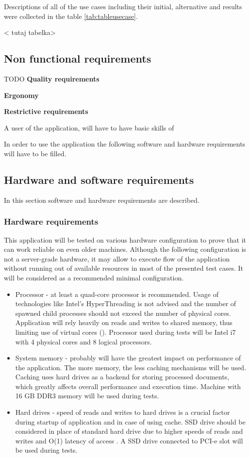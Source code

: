 Descriptions of all of the use cases including their initial, alternative and results were collected in the table \ref{tab:tableusecase}.
\vspace{5em}

< tutaj tabelka>
    
\subsection{Non functional requirements}
TODO
\textbf{Quality requirements}


\textbf{Ergonomy}
\label{interfaceerg}


\textbf{Restrictive requirements}

A user of the application, will have to have basic skills of 


In order to use the application the following software and hardware requirements will have to be filled.

\subsection{Hardware and software requirements}
In this section software and hardware requirements are described.

\subsubsection{Hardware requirements}
This application will be tested on various hardware configuration to prove that it can work reliable on even older machines. Although the following configuration is not a server-grade hardware, it may allow to execute flow of the application without running out of available resources in most of the presented test cases. It will be considered as a recommended minimal configuration.
\begin{itemize}
	\item Processor - at least a quad-core processor is recommended. Usage of technologies like Intel's HyperThreading is not advised and the number of spawned child processes should not exceed the number of physical cores. Application will rely heavily on reads and writes to shared memory, thus limiting use of virtual cores (\cite{performance_ht}). Processor used during tests will be Intel i7 with 4 physical cores and 8 logical processors.
	\item System memory - probably will have the greatest impact on performance of the application. The more memory, the less caching mechanisms will be used. Caching uses hard drives as a backend for storing processed documents, which greatly affects overall performance and execution time. Machine with 16 GB DDR3 memory will be used during tests.
	\item Hard drives - speed of reads and writes to hard drives is a crucial factor during startup of application and in case of using cache. SSD drive should be considered in place of standard hard drive due to higher speeds of reads and writes and O(1) latency of access \cite{performance_hdd_ssd}. A SSD drive connected to PCI-e slot will be used during tests.
\end{itemize}


